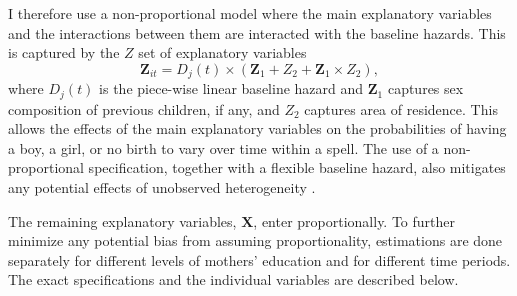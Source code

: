 \documentclass[12pt,letterpaper]{article}
\begin{document}
I therefore use a non-proportional model where the main 
explanatory variables and the interactions between them are interacted with the baseline hazards.
This is captured by the $Z$ set of explanatory variables
\begin{equation}
 \mathbf{Z}_{it} = D_j(t) \times (\mathbf{Z}_1 + Z_2 + \mathbf{Z}_1 \times Z_2),
\end{equation}
where $D_j(t)$ is the piece-wise linear baseline hazard and $\mathbf{Z}_1$ captures sex 
composition of previous children, if any, and $Z_2$ captures area of residence.
This allows the effects of the main explanatory variables 
on the probabilities of having a boy, a girl, or no birth to vary over time within a spell.
The use of a non-proportional specification, together with a flexible baseline hazard, 
also mitigates any potential effects of unobserved heterogeneity \citep{Dolton1995}.

The remaining explanatory variables, $\mathbf{X}$, enter proportionally.
To further minimize any potential bias from assuming proportionality, estimations are 
done separately for different levels of mothers' education and for different time periods.
The exact specifications and the individual variables are described below.
\end{document}
